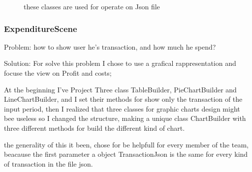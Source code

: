 \documentclass[a4paper,12pt]{report}
\begin{document}
            \begin{figure}[H]
                \caption{these classes are used for operate on Json file}
                \label{fig:my_label}
            \end{figure}



	\subsubsection{ExpenditureScene}
	Problem: how to show user he's transaction, and how much he spend?
	
	Solution: For solve this problem I chose to use a grafical rappresentation and focuse the view on Profit and costs;
	
	At the beginning I've Project Three class TableBuilder, PieChartBuilder and LineChartBuilder, and I set their methods for show only the transaction of the input period, then I realized that three classes for graphic charts design might bee useless so I changed the structure, making a unique class ChartBuilder with three different methods for build the different kind of chart.
	
	the generality of this it been, chose for be helpfull for every member of the team, beacause the first parameter a object TransactionJson is the same for every kind of transaction in the file json.
	
\end{document}
